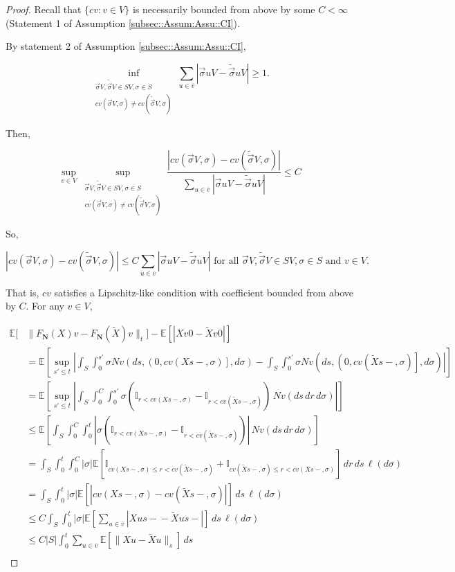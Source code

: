 \documentclass[12pt]{article}
\newcommand{\mb}{\mathbb}
\newcommand{\ov}{\overline}
\newcommand{\te}{\text}
\newcommand{\ind}{\hspace{24pt}}
\newcommand{\ex}[1]{\mb{E}\left[#1\right]}			%
\renewcommand{\v}{v}							%
\newcommand{\vv}{u}								%
\renewcommand{\S}{S}							%
\newcommand{\s}{\sigma}							%
\newcommand{\sv}{\vec{\s}}						%
\renewcommand{\t}{t}							%
\renewcommand{\tt}{s}							%
\newcommand{\ttt}{s'}							%
\newcommand{\X}{X}								%
\newcommand{\IGr}{c}							%
\newcommand{\cl}{\ov}							%
\newcommand{\const}{C}							%
\newcommand{\poisses}{\mathbf{N}}				%
\newcommand{\poiss}{N}							%
\newcommand{\Sm}{\ell}							%
\newcommand{\Fpo}{F_{\poisses}}					%
\renewcommand{\r}{r}							%
\newcommand{\alt}[1]{\widetilde{#1}}			%
\begin{document}
\begin{proof}
Recall that \(\{\IGr{\v}:\v\in V\}\) is necessarily bounded from above by some \(\const{} < \infty\) (Statement 1 of Assumption \ref{subsec::Assum:Assu::CI}). 

\ind By statement 2 of Assumption \ref{subsec::Assum:Assu::CI}, 

\[\inf_{\substack{\sv{}{V},\alt{\sv}{}{V} \in \S{V}, \s\in \S\\ \IGr{\v}(\sv{}{V},\s) \neq \IGr{\v}(\alt{\sv}{}{V},\s)}} \sum_{\vv \in \cl{\v}} |\sv{\vv}{V} - \alt{\sv}{\vv}{V}| \geq 1.\]

Then,

\[\sup_{\v\in V} \sup_{\substack{\sv{}{V},\alt{\sv}{}{V} \in \S{V}, \s\in \S\\ \IGr{\v}(\sv{}{V},\s) \neq \IGr{\v}(\alt{\sv}{}{V},\s)}} \frac{|\IGr{\v}(\sv{}{V},\s) - \IGr{\v}(\alt{\sv}{}{V},\s)|}{\sum_{\vv \in \cl{\v}} |\sv{\vv}{V} - \alt{\sv}{\vv}{V}|} \leq \const{}\]

So,

\[|\IGr{\v}(\sv{}{V},\s) - \IGr{\v}(\alt{\sv}{}{V},\s)|\leq \const{}\sum_{\vv \in \cl{\v}} |\sv{\vv}{V} - \alt{\sv}{\vv}{V}| \te{ for all } \sv{}{V},\alt{\sv}{}{V}\in \S{V},\s\in \S\te{ and }\v\in V.\]

That is, \(\IGr{\v}\) satisfies a Lipschitz-like condition with coefficient bounded from above by \(\const{}\). For any \(\v\in V\),

\begin{align*}
\mb{E}\bigg[&\|\Fpo(\X{}{}){\v} - \Fpo(\alt{\X}){\v}\|_\t\bigg] - \ex{|\X{\v}{0} - \alt{\X}{\v}{0}|}\\
&= \ex{\sup_{\ttt \leq \t}\left|\int_\S\int_0^{\ttt} \s\poiss{\v}\left(d\tt,\left(0,\IGr{\v}(\X{}{\tt-},\s)\right],d\s\right) -  \int_\S\int_0^{\ttt} \s\poiss{\v}\left(d\tt,\left(0,\IGr{\v}(\alt{\X}{}{\tt-},\s)\right],d\s\right)\right|}\\
&=\ex{\sup_{\ttt\leq \t} \left|\int_\S \int_0^{\const{}} \int_0^{\ttt} \s\left(\mb{I}_{\r < \IGr{\v}(\X{}{\tt-},\s)} - \mb{I}_{\r < \IGr{\v}(\alt{\X}{}{\tt-},\s)}\right)\,\poiss{\v}(d\tt\,d\r\,d\s)\right|}\\
&\leq \ex{\int_\S\int_0^{\const{}}\int_0^\t \left|\s\left(\mb{I}_{\r < \IGr{\v}(\X{}{\tt-},\s)} - \mb{I}_{\r < \IGr{\v}(\alt{\X}{}{\tt-},\s)}\right)\right|\,\poiss{\v}(d\tt\,d\r\,d\s)}\\
&=\int_\S\int_0^\t\int_0^{\const{}} |\s|\ex{\mb{I}_{\IGr{\v}(\X{}{\tt-},\s) \leq \r < \IGr{\v}(\alt{\X}{}{\tt-},\s)} + \mb{I}_{\IGr{\v}(\alt{\X}{}{\tt-},\s) \leq \r < \IGr{\v}(\X{}{\tt-},\s)}}\,d\r\,d\tt\,\Sm(d\s)\\
&= \int_\S\int_0^\t|\s|\ex{\left|\IGr{\v}(\X{}{\tt-},\s) - \IGr{\v}(\alt{\X}{}{\tt-},\s)\right|}\,d\tt\,\Sm(d\s)\\
&\leq \const{}\int_\S\int_0^\t |\s| \ex{\sum_{\vv \in \cl{\v}}|\X{\vv}{\tt-} - \alt{\X}{\vv}{\tt-}|}\,d\tt\,\Sm(d\s)\\
&\leq \const{}|\S|\int_0^\t \sum_{\vv \in \cl{\v}}\ex{\|\X{\vv}{} - \alt{\X}{\vv}{}\|_\tt}\,d\tt\\
\end{align*}


\end{proof}
\end{document}
